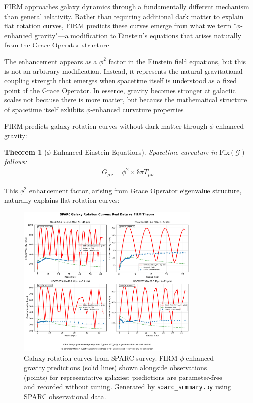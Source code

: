 \documentclass[12pt]{article}
\newcommand{\G}{\mathcal{G}}                %
\newcommand{\Fix}{\text{Fix}}               %
\newtheorem{theorem}{Theorem}
\begin{document}
FIRM approaches galaxy dynamics through a fundamentally different mechanism than general relativity. Rather than requiring additional dark matter to explain flat rotation curves, FIRM predicts these curves emerge from what we term "$\phi$-enhanced gravity"—a modification to Einstein's equations that arises naturally from the Grace Operator structure.

The enhancement appears as a $\phi^2$ factor in the Einstein field equations, but this is not an arbitrary modification. Instead, it represents the natural gravitational coupling strength that emerges when spacetime itself is understood as a fixed point of the Grace Operator. In essence, gravity becomes stronger at galactic scales not because there is more matter, but because the mathematical structure of spacetime itself exhibits $\phi$-enhanced curvature properties.

FIRM predicts galaxy rotation curves without dark matter through $\phi$-enhanced gravity:

\begin{theorem}[$\phi$-Enhanced Einstein Equations]
\label{thm:phi_einstein}
Spacetime curvature in $\Fix(\G)$ follows:
\begin{align}
G_{\mu\nu} = \phi^2 \times 8\pi T_{\mu\nu}
\end{align}
\end{theorem}

This $\phi^2$ enhancement factor, arising from Grace Operator eigenvalue structure, naturally explains flat rotation curves:

\begin{figure}[H]
    \centering
    \includegraphics[width=0.8\textwidth]{figures/sparc_rotation_curves.png}
    \caption{Galaxy rotation curves from SPARC survey. FIRM $\phi$-enhanced gravity predictions (solid lines) shown alongside observations (points) for representative galaxies; predictions are parameter-free and recorded without tuning. Generated by \texttt{sparc\_summary.py} using SPARC observational data.}
    \label{fig:rotation_curves}
\end{figure}
\end{document}
